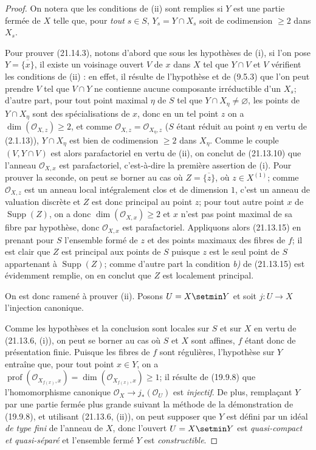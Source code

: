 \begin{proof}
On notera que les conditions de (ii) sont remplies si $Y$ est une partie fermée de $X$
telle que, pour \emph{tout} $s\in S$, $Y_s=Y\cap X_s$ soit de codimension $\geq2$ dans
$X_s$.

Pour prouver (21.14.3), notons d'abord que sous les hypothèses de (i), si l'on
pose $Y=\overline{\{x\}}$, il existe un voisinage ouvert $V$ de $x$ dans $X$ tel que
$Y\cap V$ et $V$ vérifient les conditions de (ii) : en effet, il résulte de l'hypothèse
et de (9.5.3) que l'on peut prendre $V$ tel que $V\cap Y$ ne contienne aucune
composante irréductible d'un $X_s$; d'autre part, pour tout point maximal $\eta$ de
$S$ tel que $Y\cap X_\eta\neq\varnothing$, les points de $Y\cap X_\eta$ sont des
spécialisations de $x$, donc en un tel point $z$ on a
$\dim(\mathcal O_{X,z})\geq2$, et comme
$\mathcal O_{X,z}=\mathcal O_{X_\eta,z}$ ($S$ étant réduit au point $\eta$ en vertu
de (2.1.13)), $Y\cap X_\eta$ est bien de codimension $\geq2$ dans $X_\eta$. Comme le
couple $(V,Y\cap V)$ est alors parafactoriel en vertu de (ii), on conclut de (21.13.10)
que l'anneau $\mathcal O_{X,x}$ est parafactoriel, c'est-à-dire la première assertion
de (i). Pour prouver la seconde, on peut se borner au cas où
$Z=\overline{\{z\}}$, où $z\in X^{(1)}$; comme $\mathcal O_{X,z}$ est un anneau local
intégralement clos et de dimension $1$, c'est un anneau de valuation discrète et $Z$
est donc principal au point $z$; pour tout autre point $x$ de
$\operatorname{Supp}(Z)$, on a donc $\dim(\mathcal O_{X,x})\geq2$ et $x$ n'est pas
point maximal de sa fibre par hypothèse, donc $\mathcal O_{X,x}$ est parafactoriel.
Appliquons alors (21.13.15) en prenant pour $S$ l'ensemble formé de $z$ et des points
maximaux des fibres de $f$; il est clair que $Z$ est principal aux points de $S$
puisque $z$ est le seul point de $S$ appartenant à $\operatorname{Supp}(Z)$; comme
d'autre part la condition \emph{b)} de (21.13.15) est évidemment remplie, on en conclut que
$Z$ est localement principal.

On est donc ramené à prouver (ii). Posons $U=X\setmin Y$ et soit $j:U\to X$ l'injection
canonique.

Comme les hypothèses et la conclusion sont locales sur $S$ et sur $X$ en vertu de
(21.13.6, (i)), on peut se borner au cas où $S$ et $X$ sont affines, $f$ étant donc de
présentation finie. Puisque les fibres de $f$ sont régulières, l'hypothèse sur $Y$
entraîne que, pour tout point $x\in Y$, on a $\operatorname{prof}(\mathcal O_{X_{f(x)},x})=\dim(\mathcal O_{X_{f(x)},x})\geq1$;
il résulte de (19.9.8) que l'homomorphisme canonique
$\mathcal O_X\to j_*(\mathcal O_U)$ est \emph{injectif}. De plus, remplaçant $Y$ par
une partie fermée plus grande suivant la méthode de la démonstration de (19.9.8), et
utilisant (21.13.6, (ii)), on peut supposer que $Y$ est défini par un idéal \emph{de
type fini} de l'anneau de $X$, donc l'ouvert $U=X\setmin Y$ est \emph{quasi-compact et
quasi-séparé} et l'ensemble fermé $Y$ est \emph{constructible}.


\end{proof}
